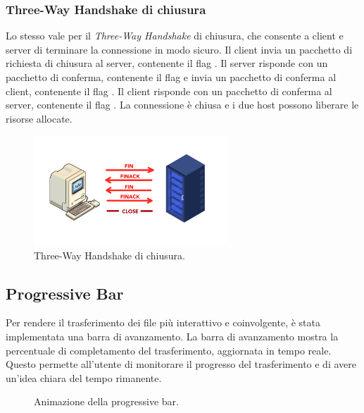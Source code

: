 \subsubsection{Three-Way Handshake di chiusura}
Lo stesso vale per il \textit{Three-Way Handshake} di chiusura, che consente a client e server di terminare la connessione in modo sicuro.
Il client invia un pacchetto di richiesta di chiusura al server, contenente il flag .
Il server risponde con un pacchetto di conferma, contenente il flag  e invia un pacchetto di conferma al client, contenente il flag .
Il client risponde con un pacchetto di conferma al server, contenente il flag .
La connessione è chiusa e i due host possono liberare le risorse allocate.

\begin{figure}[h]
    \centering
    \includegraphics[width=0.65\textwidth]{imgs/02/three-way-handshake-chiusura.jpeg}
    \caption{Three-Way Handshake di chiusura.}
\end{figure}

\subsection{Progressive Bar }
Per rendere il trasferimento dei file più interattivo e coinvolgente, è stata implementata una barra di avanzamento.
La barra di avanzamento mostra la percentuale di completamento del trasferimento, aggiornata in tempo reale.
Questo permette all'utente di monitorare il progresso del trasferimento e di avere un'idea chiara del tempo rimanente.

\begin{figure}[ht]
    \centering
    \caption{Animazione della progressive bar.}
\end{figure}
